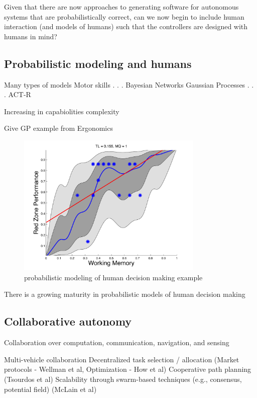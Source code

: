 Given that there are now approaches to generating software for autonomous systems that are probabilistically correct, can we now begin to include human interaction (and models of humans) such that the controllers are designed with humans in mind?

\subsection*{Probabilistic modeling and humans}

Many types of models
Motor skills
     .
     .
     .
Bayesian Networks
Gaussian Processes
     .
     .
     .
ACT-R

Increasing in capabiolities complexity

Give GP example from Ergonomics


\begin{figure}[h] 
   \centering
   \includegraphics[width=3.5in]{GP-fig.pdf} 
   \caption{probabilistic modeling of human decision making example}
   \label{fig:prob-humans}
\end{figure}

There is a growing maturity in probabilistic models of human decision making


\subsection*{Collaborative autonomy}


Collaboration over computation, communication, navigation, and sensing

Multi-vehicle collaboration 
Decentralized task selection / allocation (Market protocols - Wellman et al, Optimization - How et al) 
Cooperative path planning (Tsourdos et al)
Scalability through swarm-based techniques (e.g., consensus, potential field)  (McLain et al)


